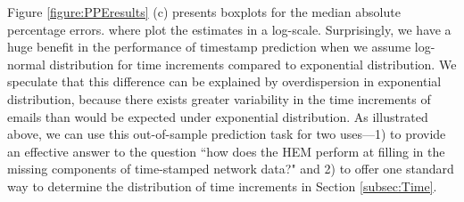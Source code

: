 \documentclass[ba]{imsart}
\numberwithin{equation}{section}
\theoremstyle{plain}
\begin{document}
	Figure \ref{figure:PPEresults} (c) presents boxplots for the median absolute percentage errors. where plot the estimates in a log-scale. Surprisingly, we have a huge benefit in the performance of timestamp prediction when we assume log-normal distribution for time increments compared to exponential distribution. We speculate that this difference can be explained by overdispersion in exponential distribution, because there exists greater variability in the time increments of emails than would be expected under exponential distribution. As illustrated above, we can use this out-of-sample prediction task for two uses---1) to provide an effective answer to the question ``how does the HEM perform at filling in the missing components of time-stamped network data?" and 2) to offer one standard way to determine the distribution of time increments in Section \ref{subsec:Time}. 
	
\end{document}
